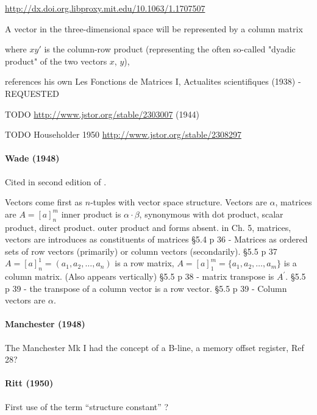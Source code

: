 \url{http://dx.doi.org.libproxy.mit.edu/10.1063/1.1707507}

A vector in the three-dimensional space will
be represented by a column matrix

where $xy'$ is the column-row product (representing
the often so-called "dyadic product" of the
two vectors $x$, $y$),

references his own Les Fonctions de Matrices I, Actualites
scientifiques (1938) - REQUESTED

TODO \url{http://www.jstor.org/stable/2303007} (1944)

TODO Householder 1950 \url{http://www.jstor.org/stable/2308297}



\paragraph{Wade (1948)~\cite{Wade1948}}

Cited in second edition of \cite{Margenau1943}.

Vectors come first as $n$-tuples with vector space structure.
Vectors are $\alpha$, matrices are $A = [a]^m_n$
inner product is $\alpha \cdot \beta$, synonymous with dot product, scalar product, direct product.
outer product and forms absent.
in Ch. 5, matrices, vectors are introduces as constituents of matrices
\S 5.4 p 36 - Matrices as ordered sets of row vectors (primarily) or column vectors (secondarily).
\S 5.5 p 37 $A = [a]^1_n = (a_1, a_2, \dots, a_n)$ is a row matrix,
$A = [a]^m_1 = \{a_1, a_2, \dots, a_m \}$ is a column matrix. (Also appears vertically)
\S 5.5 p 38 - matrix transpose is $A^\prime$.
\S 5.5 p 39 - the transpose of a column vector is a row vector.
\S 5.5 p 39 - Column vectors are $\alpha$.



\paragraph{Manchester (1948)}

The Manchester Mk I had the concept of a B-line, a memory offset register, Ref 28?



\paragraph{Ritt (1950)~\cite{Ritt1950}}

First use of the term ``structure constant'' ?


